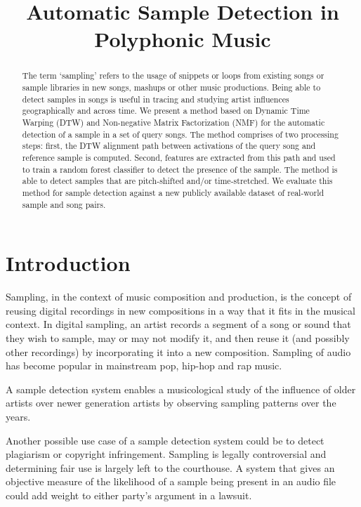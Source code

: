 \documentclass{article}
\title{Automatic Sample Detection in Polyphonic Music}
\begin{document}
%
\maketitle
%
\begin{abstract}
The term `sampling' refers to the usage of snippets or loops from existing songs or sample libraries in new songs, mashups or other music productions. Being able to detect samples in songs is useful in tracing and studying artist influences geographically and across time. We present a method based on Dynamic Time Warping (DTW) and Non-negative Matrix Factorization (NMF) for the automatic detection of a sample in a set of query songs. The method comprises of two processing steps: first, the DTW alignment path between activations of the query song and reference sample is computed. Second, features are extracted from this path and used to train a random forest classifier to detect the presence of the sample. The method is able to detect samples that are pitch-shifted and/or time-stretched. We evaluate this method for sample detection against a new publicly available dataset of real-world sample and song pairs.
\end{abstract}
%
\section{Introduction}
\label{sec:intro}

Sampling, in the context of music composition and production, is the concept of reusing digital recordings in new compositions in a way that it fits in the musical context. In digital sampling, an artist records a segment of a song or sound that they wish to sample, may or may not modify it, and then reuse it (and possibly other recordings) by incorporating it into a new composition. Sampling of audio has become popular in mainstream pop, hip-hop and rap music. 

A sample detection system enables a musicological study of the influence of older artists over newer generation artists by observing sampling patterns over the years.

Another possible use case of a sample detection system could be to detect plagiarism or copyright infringement. Sampling is legally controversial and determining fair use is largely left to the courthouse. A system that gives an objective measure of the likelihood of a sample being present in an audio file could add weight to either party's argument in a lawsuit.
\end{document}
